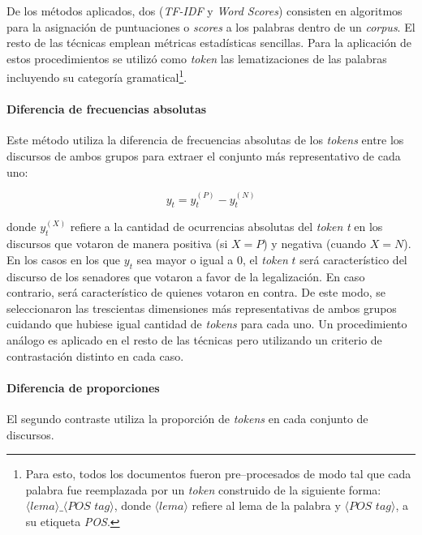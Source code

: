 De los m\'etodos aplicados, dos (\textit{TF-IDF} y \textit{Word Scores}) consisten
en algoritmos para la asignaci\'on de puntuaciones o \textit{scores} a los
palabras dentro de un \textit{corpus}. El resto de las t\'ecnicas emplean
m\'etricas estad\'isticas sencillas. Para la aplicaci\'on de estos procedimientos
se utiliz\'o como \textit{token} las lematizaciones de las palabras incluyendo
su categor\'ia gramatical\footnote{Para esto, todos los documentos fueron
pre{--}procesados de modo tal que cada palabra fue reemplazada por un
\textit{token} construido de la siguiente forma:
$\langle lema \rangle\_ \langle \textit{POS tag} \rangle$, donde
$\langle lema \rangle$ refiere al lema de la palabra y
$\langle \textit{POS tag} \rangle$, a su etiqueta \textit{POS}.}.


\paragraph{Diferencia de frecuencias absolutas}
\label{paragraph-methods-freq-abs}
Este m\'etodo utiliza la diferencia de frecuencias absolutas de los \textit{tokens} entre
los discursos de ambos grupos para extraer el conjunto m\'as representativo de
cada uno:

\begin{equation}
y_t = y_{t}^{(P)}-y_{t}^{(N)}
\end{equation}

donde $y_{t}^{(X)}$ refiere a la cantidad de ocurrencias absolutas del \textit{token}
\textit{t} en los discursos que votaron de manera positiva
(si $X=P$) y negativa (cuando $X=N$).
En los casos en los que $y_{t}$ sea mayor o igual a $0$, el \textit{token} $t$
ser\'a caracter\'istico del discurso de los senadores que votaron a favor de
la legalizaci\'on. En caso contrario, ser\'a caracter\'istico de quienes votaron
en contra.
De este modo, se seleccionaron las trescientas dimensiones m\'as representativas de
ambos grupos cuidando que hubiese igual cantidad de \textit{tokens} para cada uno.
Un procedimiento an\'alogo es aplicado en el resto de las t\'ecnicas pero utilizando
un criterio de contrastaci\'on distinto en cada caso.

\paragraph{Diferencia de proporciones}
\label{paragraph-methods-proportions}
El segundo contraste utiliza la proporci\'on de \textit{tokens}
en cada conjunto de discursos.

